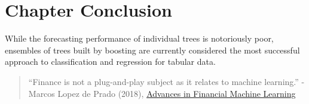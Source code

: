 \documentclass[
]{book}
\begin{document}
\hypertarget{chapter-conclusion-1}{%
\section{Chapter Conclusion}\label{chapter-conclusion-1}}

While the forecasting performance of individual trees is notoriously poor, ensembles of trees built by {boosting} are currently considered the most successful approach to classification and regression for tabular data.

\begin{quote}
``Finance is not a plug-and-play subject as it relates to machine learning.'' - Marcos Lopez de Prado (2018), \href{https://fintelligence-academy.github.io}{Advances in Financial Machine Learning}
\end{quote}

  
\end{document}
